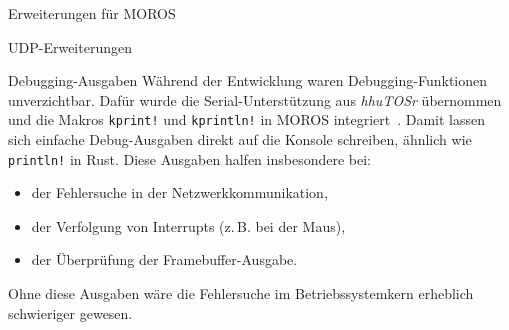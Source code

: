 \begin{section}{Erweiterungen für MOROS}
\begin{subsection}{UDP-Erweiterungen}
\end{subsection}

\begin{subsection}{Debugging-Ausgaben}
Während der Entwicklung waren Debugging-Funktionen unverzichtbar.
Dafür wurde die Serial-Unterstützung aus \emph{hhuTOSr} übernommen und die Makros \texttt{kprint!} und \texttt{kprintln!} in MOROS integriert~\cite{hhutosr_github}.
Damit lassen sich einfache Debug-Ausgaben direkt auf die Konsole schreiben, ähnlich wie \texttt{println!} in Rust.
Diese Ausgaben halfen insbesondere bei:
\begin{itemize}
    \item der Fehlersuche in der Netzwerkkommunikation,
    \item der Verfolgung von Interrupts (z.\,B. bei der Maus),
    \item der Überprüfung der Framebuffer-Ausgabe.
\end{itemize}

Ohne diese Ausgaben wäre die Fehlersuche im Betriebssystemkern erheblich schwieriger gewesen.

\end{subsection}
\end{section}